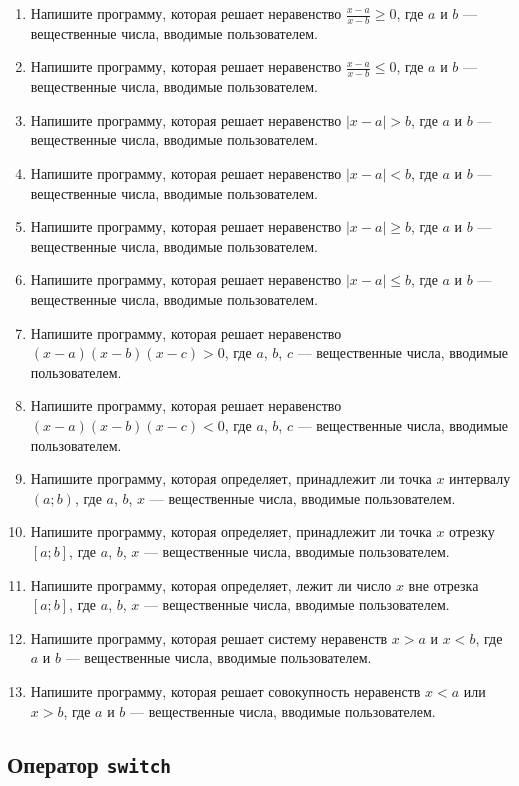\documentclass[12pt]{article}
\begin{document}
\begin{enumerate}
    \item Напишите программу, которая решает неравенство $\frac{x - a}{x - b} \geqslant 0$, где $a$ и $b$ — вещественные числа, вводимые пользователем.
    \item Напишите программу, которая решает неравенство $\frac{x - a}{x - b} \leqslant 0$, где $a$ и $b$ — вещественные числа, вводимые пользователем.
    \item Напишите программу, которая решает неравенство $|x - a| > b$, где $a$ и $b$ — вещественные числа, вводимые пользователем.
    \item Напишите программу, которая решает неравенство $|x - a| < b$, где $a$ и $b$ — вещественные числа, вводимые пользователем.
    \item Напишите программу, которая решает неравенство $|x - a| \geqslant b$, где $a$ и $b$ — вещественные числа, вводимые пользователем.
    \item Напишите программу, которая решает неравенство $|x - a| \leqslant b$, где $a$ и $b$ — вещественные числа, вводимые пользователем.
    \item Напишите программу, которая решает неравенство $(x - a)(x - b)(x - c) > 0$, где $a$, $b$, $c$ — вещественные числа, вводимые пользователем.
    \item Напишите программу, которая решает неравенство $(x - a)(x - b)(x - c) < 0$, где $a$, $b$, $c$ — вещественные числа, вводимые пользователем.
    \item Напишите программу, которая определяет, принадлежит ли точка $x$ интервалу $(a; b)$, где $a$, $b$, $x$ — вещественные числа, вводимые пользователем.
    \item Напишите программу, которая определяет, принадлежит ли точка $x$ отрезку $[a; b]$, где $a$, $b$, $x$ — вещественные числа, вводимые пользователем.
    \item Напишите программу, которая определяет, лежит ли число $x$ вне отрезка $[a; b]$, где $a$, $b$, $x$ — вещественные числа, вводимые пользователем.
    \item Напишите программу, которая решает систему неравенств $x > a$ и $x < b$, где $a$ и $b$ — вещественные числа, вводимые пользователем.
    \item Напишите программу, которая решает совокупность неравенств $x < a$ или $x > b$, где $a$ и $b$ — вещественные числа, вводимые пользователем.
\end{enumerate}


\subsection{Оператор \texttt{switch}}
\end{document}
